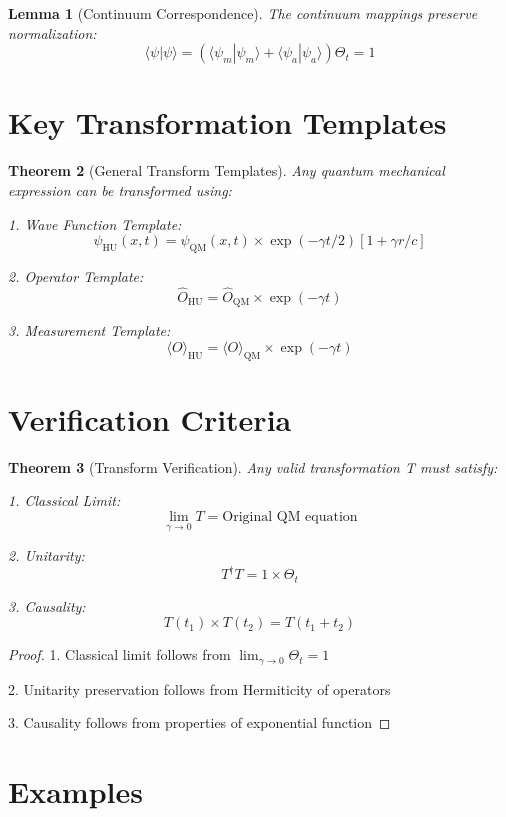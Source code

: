 \documentclass{article}
\theoremstyle{plain}
\newtheorem{theorem}{Theorem}[section]
\newtheorem{lemma}[theorem]{Lemma}
\theoremstyle{definition}
\theoremstyle{remark}
\begin{document}
\begin{lemma}[Continuum Correspondence]
The continuum mappings preserve normalization:
\[\langle\psi|\psi\rangle = (\langle\psi_m|\psi_m\rangle + \langle\psi_a|\psi_a\rangle)\Theta_t = 1\]
\end{lemma}

\section{Key Transformation Templates}

\begin{theorem}[General Transform Templates]
Any quantum mechanical expression can be transformed using:

1. Wave Function Template:
\[\psi_{\text{HU}}(x,t) = \psi_{\text{QM}}(x,t) \times \exp(-\gamma t/2)[1 + \gamma r/c]\]

2. Operator Template:
\[\hat{O}_{\text{HU}} = \hat{O}_{\text{QM}} \times \exp(-\gamma t)\]

3. Measurement Template:
\[\langle O \rangle_{\text{HU}} = \langle O \rangle_{\text{QM}} \times \exp(-\gamma t)\]
\end{theorem}

\section{Verification Criteria}

\begin{theorem}[Transform Verification]
Any valid transformation T must satisfy:

1. Classical Limit:
\[\lim_{\gamma \to 0} T = \text{Original QM equation}\]

2. Unitarity:
\[T^\dagger T = 1 \times \Theta_t\]

3. Causality:
\[T(t_1) \times T(t_2) = T(t_1+t_2)\]
\end{theorem}

\begin{proof}
1. Classical limit follows from $\lim_{\gamma \to 0} \Theta_t = 1$

2. Unitarity preservation follows from Hermiticity of operators

3. Causality follows from properties of exponential function
\end{proof}

\section{Examples}
\end{document}
